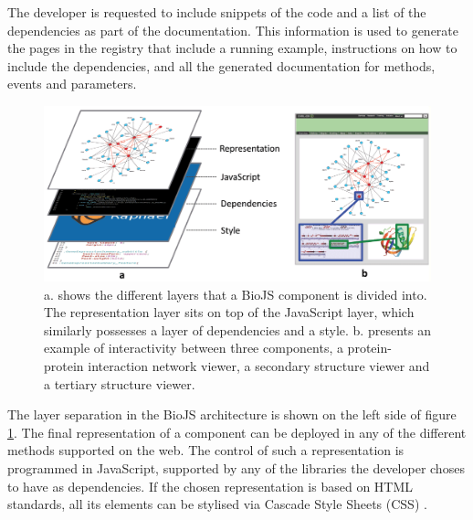 The developer is requested to include snippets of the code and a list of the dependencies as part of the documentation. This information is used to generate the pages in the registry that include a running example, instructions on how to include the dependencies, and all the generated documentation for methods, events and parameters.

\begin{figure}  
\centering
\includegraphics[width=\textwidth]{figures/biojs_layers.png}
\caption[BioJS layers.]{a. shows the different layers that a BioJS component is divided into. The representation layer sits on top of the JavaScript layer, which similarly possesses a layer of dependencies and a style. b. presents an example of interactivity between three components, a protein-protein interaction network viewer, a secondary structure viewer and a tertiary structure viewer. 
\label{fig:biojs_layers}}
\end{figure}
 
The layer separation in the BioJS architecture is shown on the left side of figure \ref{fig:biojs_layers}. The final representation of a component can be deployed in any of the different methods supported on the web. The control of such a representation is programmed in JavaScript, supported by any of the libraries the developer choses to have as dependencies. If the chosen representation is based on HTML standards, all its elements can be stylised via Cascade Style Sheets (CSS) \cite{COR2014}.

